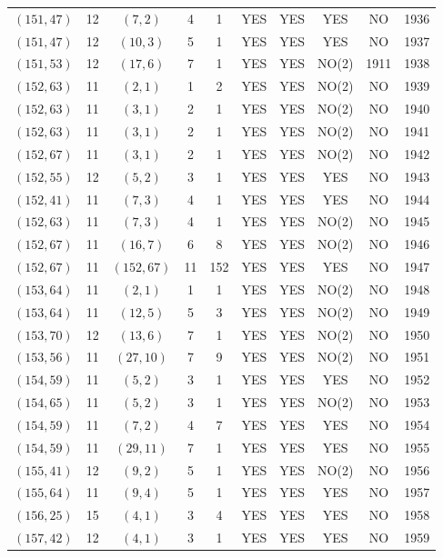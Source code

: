 \begin{longtable}{|c|c|c|c|c|c|c|c|c|c|}
$(151, 47)$ & 12 & $(7, 2)$ & 4 & 1 & YES & YES & YES & NO & 1936\\
$(151, 47)$ & 12 & $(10, 3)$ & 5 & 1 & YES & YES & YES & NO & 1937\\
$(151, 53)$ & 12 & $(17, 6)$ & 7 & 1 & YES & YES & NO(2) & 1911 & 1938\\
$(152, 63)$ & 11 & $(2, 1)$ & 1 & 2 & YES & YES & NO(2) & NO & 1939\\
$(152, 63)$ & 11 & $(3, 1)$ & 2 & 1 & YES & YES & NO(2) & NO & 1940\\
$(152, 63)$ & 11 & $(3, 1)$ & 2 & 1 & YES & YES & NO(2) & NO & 1941\\
$(152, 67)$ & 11 & $(3, 1)$ & 2 & 1 & YES & YES & NO(2) & NO & 1942\\
$(152, 55)$ & 12 & $(5, 2)$ & 3 & 1 & YES & YES & YES & NO & 1943\\
$(152, 41)$ & 11 & $(7, 3)$ & 4 & 1 & YES & YES & YES & NO & 1944\\
$(152, 63)$ & 11 & $(7, 3)$ & 4 & 1 & YES & YES & NO(2) & NO & 1945\\
$(152, 67)$ & 11 & $(16, 7)$ & 6 & 8 & YES & YES & NO(2) & NO & 1946\\
$(152, 67)$ & 11 & $(152, 67)$ & 11 & 152 & YES & YES & YES & NO & 1947\\
$(153, 64)$ & 11 & $(2, 1)$ & 1 & 1 & YES & YES & NO(2) & NO & 1948\\
$(153, 64)$ & 11 & $(12, 5)$ & 5 & 3 & YES & YES & NO(2) & NO & 1949\\
$(153, 70)$ & 12 & $(13, 6)$ & 7 & 1 & YES & YES & NO(2) & NO & 1950\\
$(153, 56)$ & 11 & $(27, 10)$ & 7 & 9 & YES & YES & NO(2) & NO & 1951\\
$(154, 59)$ & 11 & $(5, 2)$ & 3 & 1 & YES & YES & YES & NO & 1952\\
$(154, 65)$ & 11 & $(5, 2)$ & 3 & 1 & YES & YES & NO(2) & NO & 1953\\
$(154, 59)$ & 11 & $(7, 2)$ & 4 & 7 & YES & YES & YES & NO & 1954\\
$(154, 59)$ & 11 & $(29, 11)$ & 7 & 1 & YES & YES & YES & NO & 1955\\
$(155, 41)$ & 12 & $(9, 2)$ & 5 & 1 & YES & YES & NO(2) & NO & 1956\\
$(155, 64)$ & 11 & $(9, 4)$ & 5 & 1 & YES & YES & YES & NO & 1957\\
$(156, 25)$ & 15 & $(4, 1)$ & 3 & 4 & YES & YES & YES & NO & 1958\\
$(157, 42)$ & 12 & $(4, 1)$ & 3 & 1 & YES & YES & YES & NO & 1959\\

\end{longtable}
